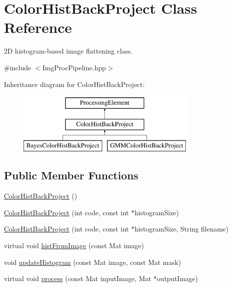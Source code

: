 \hypertarget{classColorHistBackProject}{\section{\-Color\-Hist\-Back\-Project \-Class \-Reference}
\label{classColorHistBackProject}
}


2\-D histogram-\/based image flattening class.  




{\ttfamily \#include $<$\-Img\-Proc\-Pipeline.\-hpp$>$}

\-Inheritance diagram for \-Color\-Hist\-Back\-Project\-:\begin{figure}[H]
\begin{center}
\leavevmode
\includegraphics[height=3.000000cm]{classColorHistBackProject}
\end{center}
\end{figure}
\subsection*{\-Public \-Member \-Functions}
\begin{DoxyCompactItemize}
\item 
\hyperlink{classColorHistBackProject_aaea72e6f5c80a0c1179b7a63b6f63710}{\-Color\-Hist\-Back\-Project} ()
\item 
\hyperlink{classColorHistBackProject_a2b531e8c82d9936cfaa459473e7f2691}{\-Color\-Hist\-Back\-Project} (int code, const int $\ast$histogram\-Size)
\item 
\hyperlink{classColorHistBackProject_a26852208ede0f52b8392ce15f9bf6a78}{\-Color\-Hist\-Back\-Project} (int code, const int $\ast$histogram\-Size, \-String filename)
\item 
virtual void \hyperlink{classColorHistBackProject_a380a44d3e7b934d5910bc794d918624b}{hist\-From\-Image} (const \-Mat image)
\item 
void \hyperlink{classColorHistBackProject_ada7dfb4f07fb78fd10beb4aa6392d5d0}{update\-Histogram} (const \-Mat image, const \-Mat mask)
\item 
virtual void \hyperlink{classColorHistBackProject_a071d75f28f0579b6c6e3479584828366}{process} (const \-Mat input\-Image, \-Mat $\ast$output\-Image)
\end{DoxyCompactItemize}
